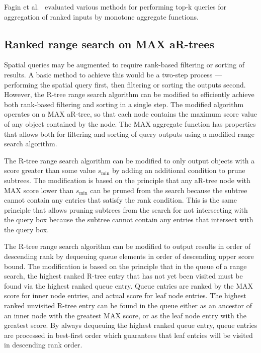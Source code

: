 Fagin et al.~\cite{fagin2003optimal} evaluated various methods for performing top-k queries for aggregation of ranked inputs by monotone aggregate functions.

\subsection{Ranked range search on MAX aR-trees}

Spatial queries may be augmented to require rank-based filtering or sorting of results. A basic method to achieve this would be a two-step process --- performing the spatial query first, then filtering or sorting the outputs second. However, the R-tree range search algorithm can be modified to efficiently achieve both rank-based filtering and sorting in a single step. The modified algorithm operates on a MAX aR-tree, so that each node contains the maximum score value of any object contained by the node. The MAX aggregate function has properties that allows both for filtering and sorting of query outputs using a modified range search algorithm.

The R-tree range search algorithm can be modified to only output objects with a score greater than some value \(s_{\min}\) by adding an additional condition to prune subtrees. The modification is based on the principle that any aR-tree node with MAX score lower than \(s_{\min}\) can be pruned from the search because the subtree cannot contain any entries that satisfy the rank condition. This is the same principle that allows pruning subtrees from the search for not intersecting with the query box because the subtree cannot contain any entries that intersect with the query box.

The R-tree range search algorithm can be modified to output results in order of descending rank by dequeuing queue elements in order of descending upper score bound. The modification is based on the principle that in the queue of a range search, the highest ranked R-tree entry that has not yet been visited must be found via the highest ranked queue entry. Queue entries are ranked by the MAX score for inner node entries, and actual score for leaf node entries. The highest ranked unvisited R-tree entry can be found in the queue either as an ancestor of an inner node with the greatest MAX score, or as the leaf node entry with the greatest score. By always dequeuing the highest ranked queue entry, queue entries are processed in best-first order which guarantees that leaf entries will be visited in descending rank order.

